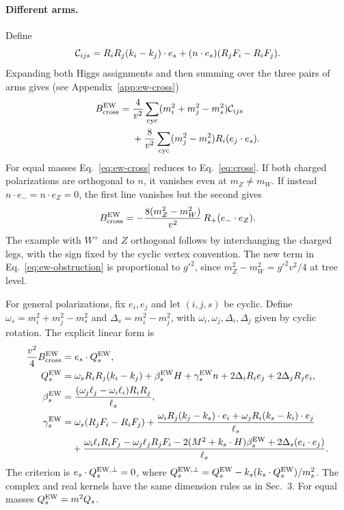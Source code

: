 \documentclass[11pt,a4paper]{article}
\begin{document}
\paragraph{Different arms.}
Define
\begin{equation}
 {\cal C}_{ijs}=R_iR_j(k_i-k_j)\cdot e_s
            +(n\cdot e_s)(R_jF_i-R_iF_j).
 \label{eq:ew-C}
\end{equation}
Expanding both Higgs assignments and then summing over the
three pairs of arms gives (see Appendix~\ref{app:ew-cross})
\begin{align}
 B_{\rm cross}^{\rm EW}
  ={}&\frac{4}{v^2}\sum_{\rm cyc}(m_i^2+m_j^2-m_s^2){\cal C}_{ijs}
      \nonumber\\
     &+\frac{8}{v^2}\sum_{\rm cyc}(m_j^2-m_s^2)R_i(e_j\cdot e_s).
 \label{eq:ew-cross}
\end{align}
For equal masses Eq.~\eqref{eq:ew-cross} reduces to
Eq.~\eqref{eq:cross}. If both charged polarizations are orthogonal to
\(n\), it vanishes even at \(m_Z\ne m_W\). If instead
\(n\cdot e_-=n\cdot e_Z=0\), the first line vanishes but the second
gives
\begin{equation}
 B_{\rm cross}^{\rm EW}
   =-\frac{8(m_Z^2-m_W^2)}{v^2}\,R_+(e_-\cdot e_Z).
 \label{eq:ew-obstruction}
\end{equation}
The example with \(W^+\) and \(Z\) orthogonal follows by interchanging
the charged legs, with the sign fixed by the cyclic vertex convention.
The new term in Eq.~\eqref{eq:ew-obstruction} is proportional to \(g'^2\), since
\(m_Z^2-m_W^2=g'^2v^2/4\) at tree level.

For general polarizations, fix \(e_i,e_j\) and let \((i,j,s)\)
be cyclic. Define \(\omega_s=m_i^2+m_j^2-m_s^2\) and
\(\Delta_s=m_i^2-m_j^2\), with \(\omega_i,\omega_j,\Delta_i,\Delta_j\)
given by cyclic rotation. The explicit linear form is
\begin{align}
 \frac{v^2}{4}B_{\rm cross}^{\rm EW}
   &=e_s\cdot Q_s^{\rm EW},\nonumber\\
 Q_s^{\rm EW}
   &=\omega_s R_iR_j(k_i-k_j)+\beta_s^{\rm EW}H
      +\gamma_s^{\rm EW}n
      +2\Delta_i R_i e_j+2\Delta_j R_j e_i,\nonumber\\
 \beta_s^{\rm EW}
   &=\frac{(\omega_j\ell_j-\omega_i\ell_i)R_iR_j}{\ell_s},\nonumber\\
 \gamma_s^{\rm EW}
   &=\omega_s(R_jF_i-R_iF_j)
    +\frac{\omega_i R_j(k_j-k_s)\cdot e_i
          +\omega_j R_i(k_s-k_i)\cdot e_j}{\ell_s}\nonumber\\
   &\quad+\frac{\omega_i\ell_i R_iF_j-\omega_j\ell_j R_jF_i
       -2(M^2+k_s\cdot H)\beta_s^{\rm EW}
       +2\Delta_s(e_i\cdot e_j)}{\ell_s}.
 \label{eq:ew-covector}
\end{align}
The criterion is \(e_s\cdot Q_s^{{\rm EW},\perp}=0\), where
\(Q_s^{{\rm EW},\perp}=Q_s^{\rm EW}-k_s(k_s\cdot Q_s^{\rm EW})/m_s^2\).
The complex and real kernels have the same dimension rules as
in Sec.~3. For equal masses \(Q_s^{\rm EW}=m^2 Q_s\).
\end{document}
